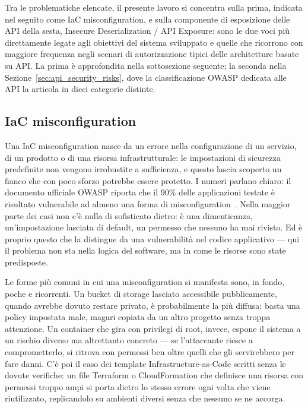 \begin{enumerate}
\end{enumerate}

Tra le problematiche elencate, il presente lavoro si concentra sulla prima, indicata nel seguito come IaC misconfiguration, e sulla componente di esposizione delle API della sesta, Insecure Deserialization / API Exposure: sono le due voci più direttamente legate agli obiettivi del sistema sviluppato e quelle che ricorrono con maggiore frequenza negli scenari di autorizzazione tipici delle architetture basate su API. La prima è approfondita nella sottosezione seguente; la seconda nella Sezione~\ref{sec:api_security_risks}, dove la classificazione OWASP dedicata alle API la articola in dieci categorie distinte.

\subsection{IaC misconfiguration}
\label{sec:cloud-misconfig}
Una IaC misconfiguration nasce da un errore nella configurazione
di un servizio, di un prodotto o di una risorsa infrastrutturale: le
impostazioni di sicurezza predefinite non vengono irrobustite a
sufficienza, e questo lascia scoperto un fianco che con poco sforzo potrebbe
essere protetto. I numeri parlano chiaro: il documento ufficiale OWASP
riporta che il 90\% delle applicazioni testate è risultato vulnerabile ad
almeno una forma di misconfiguration~\cite{owasp2021a05}. Nella maggior
parte dei casi non c'è nulla di sofisticato dietro: è una dimenticanza,
un'impostazione lasciata di default, un permesso che nessuno ha mai rivisto.
Ed è proprio questo che la distingue da una vulnerabilità nel codice
applicativo — qui il problema non sta nella logica del software, ma in come
le risorse sono state predisposte.

Le forme più comuni in cui una misconfiguration si manifesta sono, in fondo,
poche e ricorrenti. Un bucket di storage lasciato accessibile pubblicamente,
quando avrebbe dovuto restare privato, è probabilmente la più diffusa: basta
una policy impostata male, magari copiata da un altro progetto senza troppa
attenzione. Un container che gira con privilegi di root, invece, espone il
sistema a un rischio diverso ma altrettanto concreto — se l'attaccante riesce
a comprometterlo, si ritrova con permessi ben oltre quelli che gli
servirebbero per fare danni. C'è poi il caso dei template
Infrastructure-as-Code scritti senza le dovute verifiche: un file Terraform
o CloudFormation che definisce una risorsa con permessi troppo ampi si porta
dietro lo stesso errore ogni volta che viene riutilizzato, replicandolo su
ambienti diversi senza che nessuno se ne accorga.


